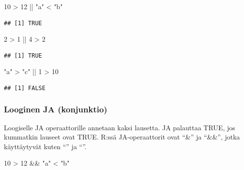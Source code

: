 \documentclass[
]{book}
\newenvironment{Shaded}{\begin{snugshade}}{\end{snugshade}}
\newcommand{\DecValTok}[1]{\textcolor[rgb]{0.00,0.00,0.81}{#1}}
\newcommand{\SpecialCharTok}[1]{\textcolor[rgb]{0.00,0.00,0.00}{#1}}
\newcommand{\StringTok}[1]{\textcolor[rgb]{0.31,0.60,0.02}{#1}}
\begin{document}
\begin{Shaded}
\begin{Highlighting}[]
\DecValTok{10} \SpecialCharTok{\textgreater{}} \DecValTok{12} \SpecialCharTok{||} \StringTok{"a"} \SpecialCharTok{\textless{}} \StringTok{"b"}
\end{Highlighting}
\end{Shaded}

\begin{verbatim}
## [1] TRUE
\end{verbatim}

\begin{Shaded}
\begin{Highlighting}[]
\DecValTok{2} \SpecialCharTok{\textgreater{}} \DecValTok{1} \SpecialCharTok{||} \DecValTok{4} \SpecialCharTok{\textgreater{}} \DecValTok{2}
\end{Highlighting}
\end{Shaded}

\begin{verbatim}
## [1] TRUE
\end{verbatim}

\begin{Shaded}
\begin{Highlighting}[]
\StringTok{"a"} \SpecialCharTok{\textgreater{}} \StringTok{"c"} \SpecialCharTok{||} \DecValTok{1} \SpecialCharTok{\textgreater{}} \DecValTok{10}
\end{Highlighting}
\end{Shaded}

\begin{verbatim}
## [1] FALSE
\end{verbatim}

\hypertarget{looginen-ja-konjunktio}{%
\subsubsection{Looginen JA (konjunktio)}\label{looginen-ja-konjunktio}}

Loogiselle JA operaattorille annetaan kaksi lausetta. JA palauttaa TRUE, jos kummatkin lauseet ovat TRUE. R:ssä JA-operaattorit ovat ``\&'' ja ``\&\&'', jotka käyttäytyvät kuten ``\textbar{}'' ja ``\textbar\textbar{}''.

\begin{Shaded}
\begin{Highlighting}[]
\DecValTok{10} \SpecialCharTok{\textgreater{}} \DecValTok{12} \SpecialCharTok{\&\&} \StringTok{"a"} \SpecialCharTok{\textless{}} \StringTok{"b"}
\end{Highlighting}
\end{Shaded}
\end{document}
